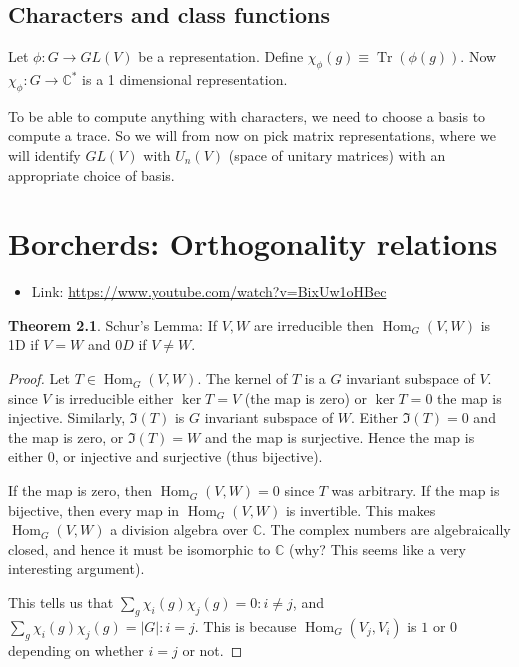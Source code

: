 \documentclass{book}
\newcommand{\Hom}{\operatorname{Hom}}
\newcommand{\Tr}{\operatorname{Tr}}
\newcommand{\C}{\ensuremath{\mathbb{C}}}
\theoremstyle{definition}
\newtheorem{theorem}{Theorem}
\begin{document}
\section{Characters and class functions}

Let $\phi: G \rightarrow GL(V)$ be a representation. Define $\chi_\phi(g) \equiv \Tr(\phi(g))$.
Now $\chi_\phi: G \rightarrow \C^*$ is a 1 dimensional representation.

To be able to compute anything with characters, we need to choose a basis to
compute a trace. So we will from now on pick matrix representations, where
we will identify $GL(V)$ with $U_n(V)$ (space of unitary matrices) with an          
appropriate choice of basis.

\chapter{Borcherds: Orthogonality relations}

\begin{itemize}
\item Link: \url{https://www.youtube.com/watch?v=BixUw1oHBec}
\end{itemize}

\begin{theorem} Schur's Lemma: If $V, W$ are irreducible then $\Hom_G(V, W)$ is 1D
if $V = W$ and $0D$ if $V \neq W$.
\end{theorem}
\begin{proof}
Let $T \in \Hom_G(V, W)$. The kernel of $T$ is a $G$ invariant subspace of $V$. since $V$
is irreducible either $\ker T = V$ (the map is zero) or $\ker T = 0$ the map is
injective. Similarly, $\Im(T)$ is $G$ invariant subspace  of $W$. Either $\Im(T) = 0$
and the map is zero, or $\Im(T) = W$ and the map is surjective. Hence the map
is either 0, or injective and surjective (thus bijective).


If the map is zero, then $\Hom_G(V, W) = 0$ since $T$ was arbitrary.
If the map is bijective, then every map in $\Hom_G(V, W)$ is invertible. This 
makes $\Hom_G(V, W)$ a division algebra over $\C$. The complex numbers are
algebraically closed, and hence it must be isomorphic to $\C$ (why? This seems
like a very interesting argument).

This tells us that $\sum_g \chi_i(g) \chi_j(g) = 0 : i \neq j$, and
$\sum_g \chi_i(g) \chi_j(g) = |G| : i = j$. This is because $\Hom_G(V_j, V_i)$ is
$1$ or $0$ depending on whether $i = j$ or not.
\end{proof}
\end{document}
